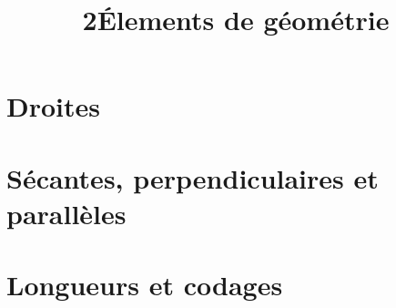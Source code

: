 \documentclass[12pt,a4paper]{article}
\date{}
\title{\textcircled{{\normalsize{2}}}\'Elements de géométrie}
\begin{document}
%
%


\maketitle



\section{Droites}



\newpage


\section{Sécantes, perpendiculaires et parallèles}



%
%

\newpage
\section{Longueurs et codages}
%

\end{document}
